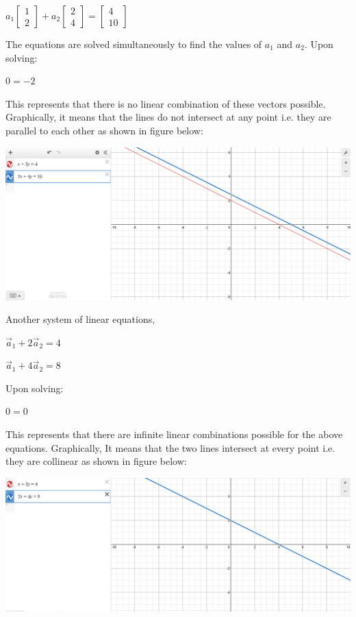 \documentclass[a4paper, 11pt]{article}
\begin{document}
\begin{enumerate}
	$a_1 
	\begin{bmatrix} 
		1 \\ 
		2 
	\end{bmatrix}
	+ a_2
	\begin{bmatrix}
	2 \\
	4
	\end{bmatrix}
	= 
	\begin{bmatrix}
	4 \\
	10
	\end{bmatrix}
	$
	
	The equations are solved simultaneously to find the values of $a_1$ and $a_2$.
	Upon solving:
	\begin{center}
	$0 = -2$
	\end{center}
	This represents that there is no linear combination of these vectors possible. Graphically, it means that the lines do not 
	intersect at any point i.e. they are parallel to each other as shown in figure below:

	\begin{center}
  	\includegraphics[width=\linewidth]{images/no solution line.PNG}
	\end{center}

	Another system of linear equations,
	
	\begin{center}
	$\vec a_1 + 2\vec a_2 = 4$ 

	$\vec a_1 + 4\vec a_2 = 8$
	\end{center}  
	
	
	Upon solving:
	\begin{center}
		$0 = 0$
	\end{center}
	
	This represents that there are infinite linear combinations possible for the above equations. Graphically, It means that the two lines intersect at every point i.e. they are collinear as shown in figure below:
	
	\begin{center}
  	\includegraphics[width=\linewidth]{images/infinitely_many_solutions.PNG}
	\end{center}


\end{enumerate}
\end{document}
